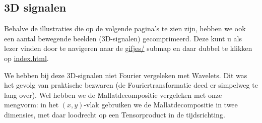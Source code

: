 \subsection{3D signalen}
Behalve de illustraties die op de volgende pagina's te zien zijn, hebben we ook een aantal bewegende beelden (3D-signalen) gecomprimeerd. Deze kunt u als lezer vinden door te navigeren naar de \url{gifjes/} submap en daar dubbel te klikken op \url{index.html}.

We hebben bij deze 3D-signalen niet Fourier vergeleken met Wavelets. Dit was het gevolg van praktische bezwaren 
(de Fouriertransformatie deed er simpelweg te lang over). 
Wel hebben we de Mallatdecompositie vergeleken met onze mengvorm: 
in het $(x,y)$-vlak gebruiken we de Mallatdecompositie in twee dimensies, 
met daar loodrecht op een Tensorproduct in de tijdsrichting.

